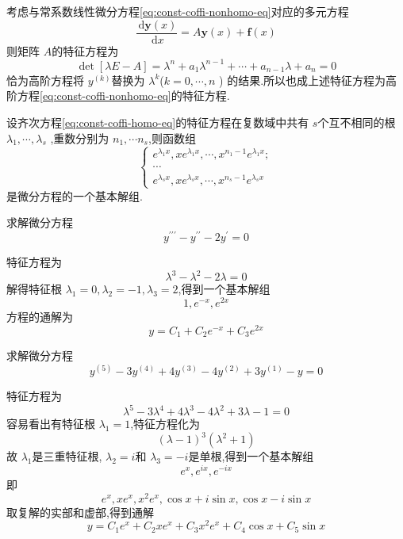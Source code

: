 \documentclass[lang=cn,12pt,color=green,fontset=none]{elegantbook}
\begin{document}
\begin{definition}
    考虑与常系数线性微分方程\ref{eq:const-coffi-nonhomo-eq}对应的多元方程 $$
    \frac{\,\mathrm{d} \mathbf{y}\left( x \right)  }{ \,\mathrm{d} x} = A  \mathbf{y}\left( x \right)+ \mathbf{f}\left( x \right)  
    $$则矩阵 $ A $的特征方程为 \begin{equation}
        \det [ \lambda E-A] =  \lambda ^{n}+ a_1 \lambda ^{n-1}+ \cdots + a_{n-1} \lambda + a_{n} =0
    \end{equation}恰为高阶方程将 $ y^{\left( k \right) } $替换为 $  \lambda ^{k} $($ k=0,\cdots ,n $ )   的结果.所以也成上述特征方程为高阶方程\ref{eq:const-coffi-nonhomo-eq}的特征方程.
\end{definition}

\begin{theorem}
    设齐次方程\ref{eq:const-coffi-homo-eq}的特征方程在复数域中共有 $ s $个互不相同的根 $  \lambda _{1},\cdots , \lambda _{s} $  ,重数分别为 $ n_1,\cdots n_{s} $,则函数组 
    \begin{equation}
        \begin{cases} e^{ \lambda _{1}x}, xe^{ \lambda _{1}x},\cdots ,x^{n_1-1}e^{ \lambda _{1}x};\\ 
         \cdots \\ 
          e^{ \lambda _{s}x},xe^{ \lambda _{s}x},\cdots ,x^{n_{s}-1}e^{ \lambda _{s}x} \end{cases} 
    \end{equation}是微分方程的一个基本解组. 
\end{theorem}

\begin{example}
    求解微分方程 $$
    y^{\prime \prime\prime}- y^{\prime \prime} -2y^{\prime} =0 
    $$
\end{example}
\begin{solution}
    特征方程为 $$
     \lambda ^{3}- \lambda ^{2}-2 \lambda =0
    $$解得特征根 $  \lambda _{1}=0, \lambda _{2}=-1, \lambda _{3}=2 $,得到一个基本解组 $$
    1,e^{-x},e^{2x}
    $$ 方程的通解为 $$
    y= C_1+ C_2e^{-x}+ C_3e^{2x}
    $$
\end{solution}

\begin{example}
    求解微分方程 $$
    y^{\left( 5 \right) }-3y^{\left( 4 \right) }+ 4 y^{\left( 3 \right) }-4y^{\left( 2 \right) }+ 3y^{\left( 1 \right) }-y=0
    $$
    \begin{solution}
        特征方程为 $$
     \lambda ^{5}-3 \lambda ^{4}+ 4 \lambda ^{3}-4 \lambda ^{2}+ 3 \lambda -1=0
    $$容易看出有特征根 $  \lambda _{1}=1 $,特征方程化为 $$
   \left(  \lambda -1 \right)^{3} \left(  \lambda ^{2}+ 1 \right)  
    $$ 故 $  \lambda _{1} $是三重特征根, $  \lambda _{2}= i $和 $  \lambda _{3}=-i $是单根,得到一个基本解组 $$
    e^{x},e^{ix},e^{-ix}
    $$   即 $$
    e^{x},xe^{x},x^{2}e^{x},\cos x+ i\sin x, \cos x -i\sin x
    $$取复解的实部和虚部,得到通解 $$
    y=C_1e^{x}+ C_2xe^{x}+ C_3x^{2}e^{x}+ C_4\cos x+ C_5\sin x
    $$
    \end{solution}
\end{example}
\end{document}
